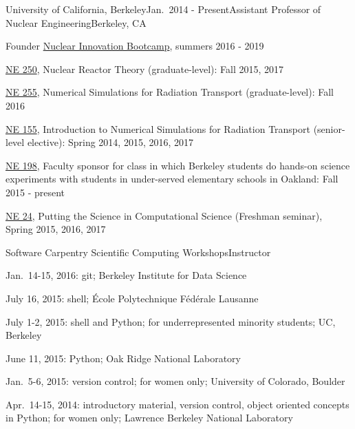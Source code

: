 \begin{rSubsection}{University of California, Berkeley}{Jan.\ 2014 - Present}{Assistant Professor of Nuclear Engineering}{Berkeley, CA}
\item Founder \href{http://nuclearinnovationalliance.org/bootcamp}{Nuclear
Innovation Bootcamp}, summers 2016 - 2019 
\item \href{https://github.com/rachelslaybaugh/NE250 }{NE 250}, Nuclear Reactor Theory (graduate-level): Fall 2015, 2017
\item \href{https://github.com/rachelslaybaugh/NE255}{NE 255}, Numerical Simulations for Radiation Transport (graduate-level): Fall 2016
\item \href{https://github.com/rachelslaybaugh/NE155}{NE 155}, Introduction to Numerical Simulations for Radiation Transport (senior-level elective): Spring 2014, 2015, 2016, 2017
\item \href{http://soesberkeley.weebly.com/}{NE 198}, Faculty sponsor for class
in which Berkeley students do hands-on science experiments with students in
under-served elementary schools in Oakland: Fall 2015 - present
\item \href{https://github.com/rachelslaybaugh/NE24}{NE 24}, Putting the Science in Computational Science (Freshman seminar), Spring 2015, 2016, 2017
\end{rSubsection}


\begin{rSubsection}{Software Carpentry Scientific Computing Workshops}{}{Instructor}{}
\item Jan.\ 14-15, 2016: git; Berkeley Institute for Data Science
\item July 16, 2015: shell; \'{E}cole Polytechnique F\'{e}d\'{e}rale Lausanne
\item July 1-2, 2015: shell and Python; for underrepresented minority students; UC, Berkeley
\item June 11, 2015: Python; Oak Ridge National Laboratory
\item Jan.\ 5-6, 2015: version control; for women only; University of Colorado, Boulder
\item Apr.\ 14-15, 2014: introductory material, version control, object oriented concepts in Python; for women only; Lawrence Berkeley National Laboratory
\end{rSubsection}



